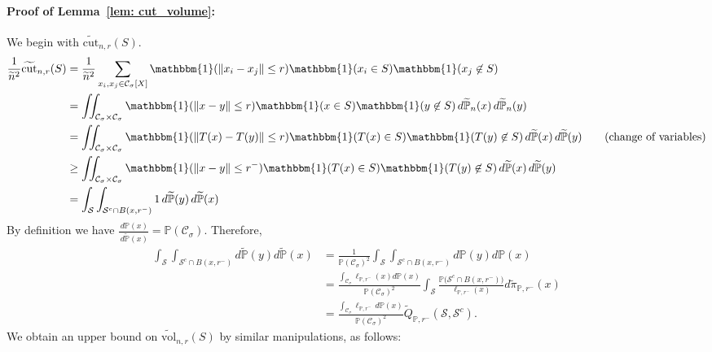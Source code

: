 \documentclass[11pt,twoside]{article}
\theoremstyle{definition}
\newcommand{\vol}{\mathrm{vol}}
\newcommand{\cut}{\mathrm{cut}}
\newcommand{\norm}[1]{\left\lVert#1\right\rVert}
\newcommand{\1}{\mathbbm{1}}
\newcommand{\Xbf}{X}
\newcommand{\Pbb}{\mathbb{P}}
\newcommand{\Sset}{\mathcal{S}}
\newcommand{\Cset}{\mathcal{C}}
\newcommand{\Csig}{\Cset_{\sigma}}
\newcommand{\piwt}{\widetilde{\pi}}
\begin{document}
\paragraph{Proof of Lemma~\ref{lem: cut_volume}: }

We begin with $\widetilde{\cut}_{n,r}(S)$.
\begin{align*}
\frac{1}{\widetilde{n}^2} \widetilde{\cut}_{n,r}(S) & = \frac{1}{ \widetilde{n}^2} \sum_{x_i, x_j \in \Csig[\Xbf]} \1(\norm{x_i - x_j} \leq r) \1(x_i \in S) \1(x_j \not\in S)\\
& = \iint_{\Csig \times \Csig} \1(\norm{x - y} \leq r) \1(x \in S) \1(y \not\in S) \,d\widetilde{\Pbb}_n(x) \,d\widetilde{\Pbb}_n(y) \\
& =  \iint_{\Csig \times \Csig} \1(\norm{T(x) - T(y)} \leq r) \1(T(x) \in S) \1(T(y) \not\in S)\,d\widetilde{\Pbb}(x) \,d\widetilde{\Pbb}(y) \tag{change of variables}  \\
& \geq \iint_{\Csig \times \Csig} \1(\norm{x - y} \leq r^-) \1(T(x) \in S) \1(T(y) \not\in S) \,d\widetilde{\Pbb}(x) \,d\widetilde{\Pbb}(y) \\
& = \int_{\Sset} \int_{\Sset^c \cap B(x,r^-)} 1 \,d\widetilde{\Pbb}(y) \,d\widetilde{\Pbb}(x)
\end{align*}
By definition we have $\frac{\,d\Pbb(x)}{\,d\widetilde{\Pbb}(x)} = \Pbb(\Csig)$. Therefore,
\begin{align}
\int_{\Sset} \int_{\Sset^c \cap B(x,r^-)} d\widetilde{\Pbb}(y) d\widetilde{\Pbb}(x) & = \frac{1}{\Pbb(\Csig)^2} \int_{\Sset} \int_{\Sset^c \cap B(x,r^-)} d\Pbb(y) d\Pbb(x) \nonumber \\
& = \frac{\int_{\Csig} \ell_{\Pbb,r^-}(x) d\Pbb(x)}{\Pbb(\Csig)^2} \int_{\Sset} \frac{\Pbb\bigl(\Sset^c \cap B(x,r^-)\bigr)}{\ell_{\Pbb,r^-}(x)} d\piwt_{\Pbb,r^-}(x) \nonumber \\
& = \frac{\int_{\Csig} \ell_{\Pbb,r^-}\,d\Pbb(x)}{\Pbb(\Csig)^2} \widetilde{Q}_{\Pbb,r^-}(\Sset, \Sset^c). \label{eqn: cut_bound}
\end{align}	
We obtain an upper bound on $\widetilde{\vol}_{n,r}(S)$ by similar manipulations, as follows:
\end{document}
